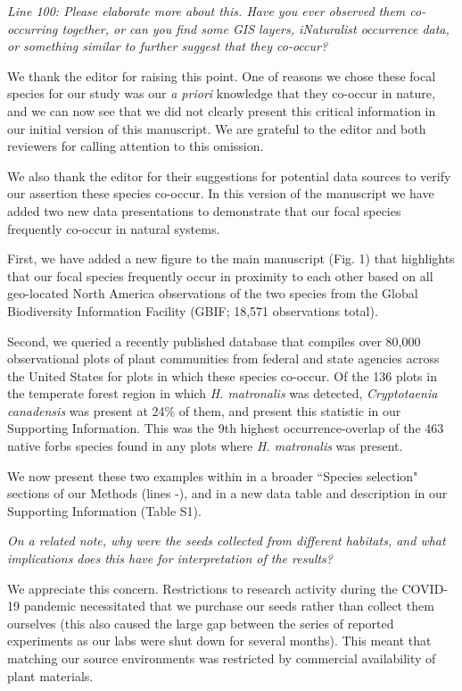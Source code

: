 \documentclass[11pt]{article}
\begin{document}
\emph{Line 100: Please elaborate more about this. Have you ever observed them co-occurring together, or can you find some GIS layers, iNaturalist occurrence data, or something similar to further suggest that they co-occur?} 

We thank the editor for raising this point. One of reasons we chose these focal species for our study was our \emph{a priori} knowledge that they co-occur in nature, and we can now see that we did not clearly present this critical information in our initial version of this manuscript. We are grateful to the editor and both reviewers for calling attention to this omission.

We also thank the editor for their suggestions for potential data sources to verify our assertion these species co-occur. In this version of the manuscript we have added two new data presentations to demonstrate that our focal species frequently co-occur in natural systems. 

First, we have added a new figure to the main manuscript (Fig. 1) that highlights that our focal species frequently occur in proximity to each other based on all geo-located North America observations of the two species from the Global Biodiversity Information Facility (GBIF; 18,571 observations total).

Second, we queried a recently published database that compiles over 80,000 observational plots of plant communities from federal and state agencies across the United States for plots in which these species co-occur. Of the 136 plots in the temperate forest region in which \emph{H. matronalis} was detected, \emph{Cryptotaenia canadensis} was present at 24\% of them, and present this statistic in our Supporting Information. This was the 9th highest occurrence-overlap of the 463 native forbs species found in any plots where \emph{H. matronalis} was present. %

We now present these two examples within in a broader ``Species selection" sections of our Methods (lines -), and in a new data table and description in our Supporting Information (Table S1).


\emph{On a related note, why were the seeds collected from different habitats, and what implications does this have for interpretation of the results?}

We appreciate this concern. Restrictions to research activity during the COVID-19 pandemic necessitated that we purchase our seeds rather than collect them ourselves (this also caused the large gap between the series of reported experiments as our labs were shut down for several months). This meant that matching our source environments was restricted by commercial availability of plant materials. %
\end{document}
